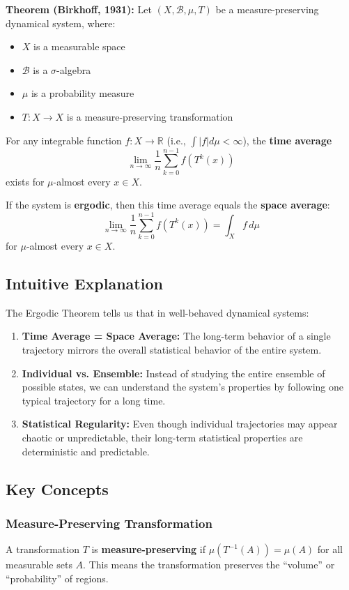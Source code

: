 \documentclass[12pt,a4paper]{article}
\begin{document}
\textbf{Theorem (Birkhoff, 1931):} Let $(X, \mathcal{B}, \mu, T)$ be a measure-preserving dynamical system, where:
\begin{itemize}
    \item $X$ is a measurable space
    \item $\mathcal{B}$ is a $\sigma$-algebra
    \item $\mu$ is a probability measure
    \item $T: X \to X$ is a measure-preserving transformation
\end{itemize}

For any integrable function $f: X \to \mathbb{R}$ (i.e., $\int |f| d\mu < \infty$), the \textbf{time average}
\[
\lim_{n \to \infty} \frac{1}{n} \sum_{k=0}^{n-1} f(T^k(x))
\]
exists for $\mu$-almost every $x \in X$.

If the system is \textbf{ergodic}, then this time average equals the \textbf{space average}:
\[
\lim_{n \to \infty} \frac{1}{n} \sum_{k=0}^{n-1} f(T^k(x)) = \int_X f \, d\mu
\]
for $\mu$-almost every $x \in X$.

\subsection{Intuitive Explanation}

The Ergodic Theorem tells us that in well-behaved dynamical systems:

\begin{enumerate}
    \item \textbf{Time Average = Space Average:} The long-term behavior of a single trajectory mirrors the overall statistical behavior of the entire system.
    \item \textbf{Individual vs. Ensemble:} Instead of studying the entire ensemble of possible states, we can understand the system's properties by following one typical trajectory for a long time.
    \item \textbf{Statistical Regularity:} Even though individual trajectories may appear chaotic or unpredictable, their long-term statistical properties are deterministic and predictable.
\end{enumerate}

\subsection{Key Concepts}

\subsubsection{Measure-Preserving Transformation}
A transformation $T$ is \textbf{measure-preserving} if $\mu(T^{-1}(A)) = \mu(A)$ for all measurable sets $A$. This means the transformation preserves the ``volume'' or ``probability'' of regions.
\end{document}
